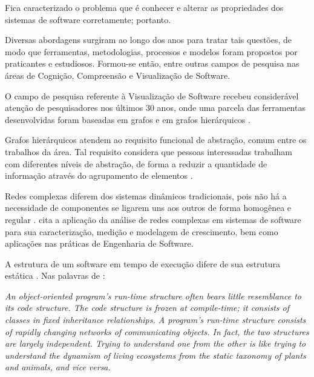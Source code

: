 Fica caracterizado o problema que é conhecer e alterar as propriedades dos
sistemas de software corretamente; portanto.

Diversas abordagens surgiram ao longo dos anos para tratar tais questões, de
modo que ferramentas, metodologias, processos e modelos foram propostos por
praticantes e estudiosos. Formou-se então, entre outras campos de pesquisa nas
áreas de Cognição, Compreensão e Visualização de Software.

O campo de pesquisa referente à Visualização de Software recebeu considerável
atenção de pesquisadores nos últimos 30 anos, onde uma parcela das ferramentas
desenvolvidas foram baseadas em grafos \cite{Storey2006:Theories} e em grafos
hierárquicos \cite{Jahnke2002:Visualizations}.

Grafos hierárquicos atendem ao requisito funcional de abstração, comum entre os
trabalhos da área. Tal requisito considera que pessoas interessadas trabalham
com diferentes níveis de abstração, de forma a reduzir a quantidade de
informação através do agrupamento de elementos \cite{Kienle2007:Requirements}.

Redes complexas diferem dos sistemas dinâmicos tradicionais, pois não há a
necessidade de componentes se ligarem uns aos outros de forma homogênea e
regular \cite{Sayama:2015:Complex}.
 cita a aplicação da análise de redes complexas
em sistemas de software para sua caracterização, medição e modelagem de
crescimento, bem como aplicações nas práticas de Engenharia de Software.


A estrutura de um software em tempo de execução difere de sua estrutura
estática \cite{Crockford2008:JavaScriptGoodParts}.
Nas palavras de :

\begin{citacao}
\textit{An object-oriented program's run-time structure often bears little
resemblance to its code structure. The code structure is frozen at compile-time;
it consists of classes in fixed inheritance relationships. A program's run-time
structure consists of rapidly changing networks of communicating objects. In
fact, the two structures are largely independent. Trying to understand one from
the other is like trying to understand the dynamism of living ecosystems from
the static taxonomy of plants and animals, and vice versa.}
\end{citacao}

